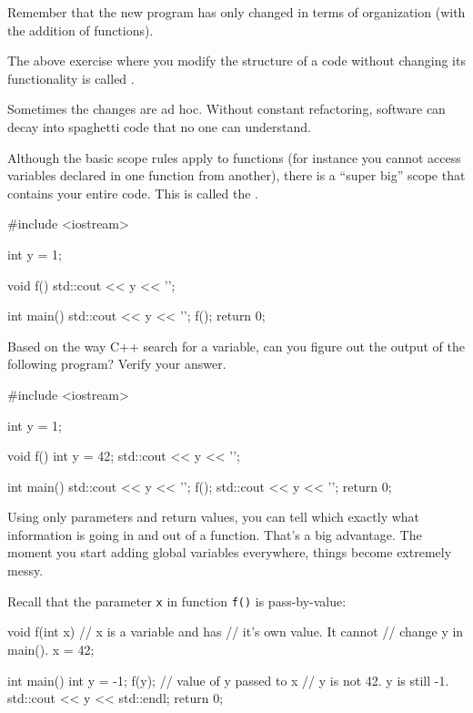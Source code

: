 Remember that the new program has only changed in terms of organization (with the addition of functions).

The above exercise where you modify the structure of a code without changing its functionality is called .

Sometimes the changes are ad hoc. Without constant refactoring, software can decay into spaghetti code that no one can understand.

\newpage{}

Although the basic scope rules apply to functions (for instance you cannot access variables declared in one function from another), there is a ``super big'' scope that contains your entire code. This is called the .

\begin{consolethree}[escapeinside=||]
#include <iostream>

int y = 1;

void f()
{
    std::cout << y << '\n';
}

int main()
{
    std::cout << y << '\n';
    f();
    return 0;
}
\end{consolethree}


\newpage{}

Based on the way C++ search for a variable, can you figure out the output of the following program? Verify your answer.

\begin{consolethree}[escapeinside=||]
#include <iostream>

int y = 1;

void f()
{
    int y = 42;
    std::cout << y << '\n';
}

int main()
{
    std::cout << y << '\n';
    f();
    std::cout << y << '\n';
    return 0;
}
\end{consolethree}

Using only parameters and return values, you can tell which exactly what information is going in and out of a function. That's a big advantage. The moment you start adding global variables everywhere, things become extremely messy.



\newpage{}

Recall that the parameter \texttt{x} in function \texttt{f()} is pass-by-value:

\begin{consolethree}[escapeinside=||]
void f(int x) // x is a variable and has
              // it's own value. It cannot
              // change y in main().
{
    x = 42;
}

int main()
{
    int y = -1;
    f(y); // value of y passed to x
    // y is not 42. y is still -1.
    std::cout << y << std::endl;
    return 0;
}
\end{consolethree}

